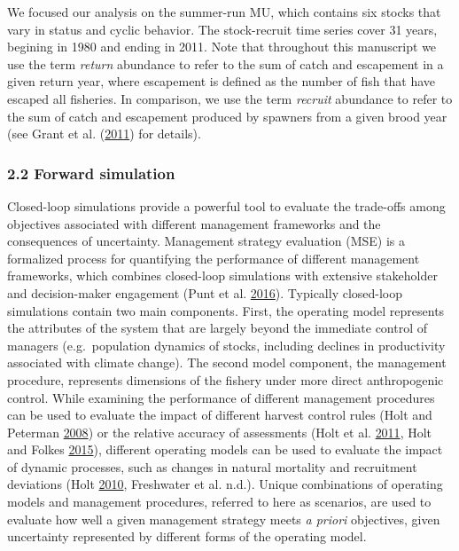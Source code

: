 \documentclass[11pt]{book}
\begin{document}
We focused our analysis on the summer-run MU, which contains six stocks that vary in status and cyclic behavior. The stock-recruit time series cover 31 years, begining in 1980 and ending in 2011. Note that throughout this manuscript we use the term \emph{return} abundance to refer to the sum of catch and escapement in a given return year, where escapement is defined as the number of fish that have escaped all fisheries. In comparison, we use the term \emph{recruit} abundance to refer to the sum of catch and escapement produced by spawners from a given brood year (see Grant et al. (\protect\hyperlink{ref-Grant2011}{2011}) for details).

\subsubsection{2.2 Forward simulation}\label{forward-simulation}

Closed-loop simulations provide a powerful tool to evaluate the trade-offs among objectives associated with different management frameworks and the consequences of uncertainty. Management strategy evaluation (MSE) is a formalized process for quantifying the performance of different management frameworks, which combines closed-loop simulations with extensive stakeholder and decision-maker engagement (Punt et al. \protect\hyperlink{ref-Punt2016}{2016}). Typically closed-loop simulations contain two main components. First, the operating model represents the attributes of the system that are largely beyond the immediate control of managers (e.g.~population dynamics of stocks, including declines in productivity associated with climate change). The second model component, the management procedure, represents dimensions of the fishery under more direct anthropogenic control. While examining the performance of different management procedures can be used to evaluate the impact of different harvest control rules (Holt and Peterman \protect\hyperlink{ref-Holt2008}{2008}) or the relative accuracy of assessments (Holt et al. \protect\hyperlink{ref-KHolt2011}{2011}, Holt and Folkes \protect\hyperlink{ref-Holt2015}{2015}), different operating models can be used to evaluate the impact of dynamic processes, such as changes in natural mortality and recruitment deviations (Holt \protect\hyperlink{ref-Holt2010}{2010}, Freshwater et al. n.d.). Unique combinations of operating models and management procedures, referred to here as scenarios, are used to evaluate how well a given management strategy meets \emph{a priori} objectives, given uncertainty represented by different forms of the operating model.
\end{document}

